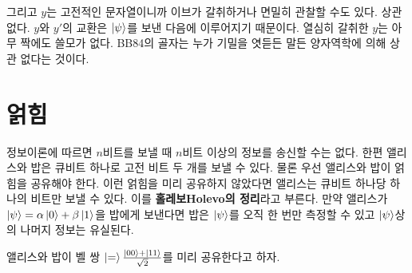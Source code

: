 \documentclass[a4paper,chapter,atbegshi]{oblivoir}
\begin{document}
그리고 $y$는 고전적인 문자열이니까 이브가 갈취하거나 면밀히 관찰할 수도 있다.
상관 없다. $y$와 $y'$의 교환은 $\ket{\psi}$를 보낸 다음에 이루어지기
때문이다. 열심히 갈취한 $y$는 아무 짝에도 쓸모가 없다. BB84의 골자는
누가 기밀을 엿듣든 말든 양자역학에 의해 상관 없다는 것이다.
\chapter{얽힘}
정보이론에 따르면 $n$비트를 보낼 때 $n$비트 이상의 정보를 송신할 수는
없다. 한편 앨리스와 밥은 큐비트 하나로 고전 비트 두 개를 보낼 수 있다.
물론 우선 앨리스와 밥이 얽힘을 공유해야 한다. 이런 얽힘을 미리
공유하지 않았다면 앨리스는 큐비트 하나당 하나의 비트만 보낼 수 있다. 이를
\textbf{홀레보{\tiny Holevo}의 정리}라고 부른다. 만약 앨리스가 $\ket{\psi}=
\alpha\ket0+\beta\ket1$을 밥에게 보낸다면 밥은 $\ket{\psi}$를 오직 한 번만
측정할 수 있고 $\ket{\psi}$상의 나머지 정보는 유실된다.

앨리스와 밥이 벨 쌍 $\ket=\frac{\ket{00}+\ket{11}}{\sqrt2}$를 미리 공유한다고
하자.
\end{document}
